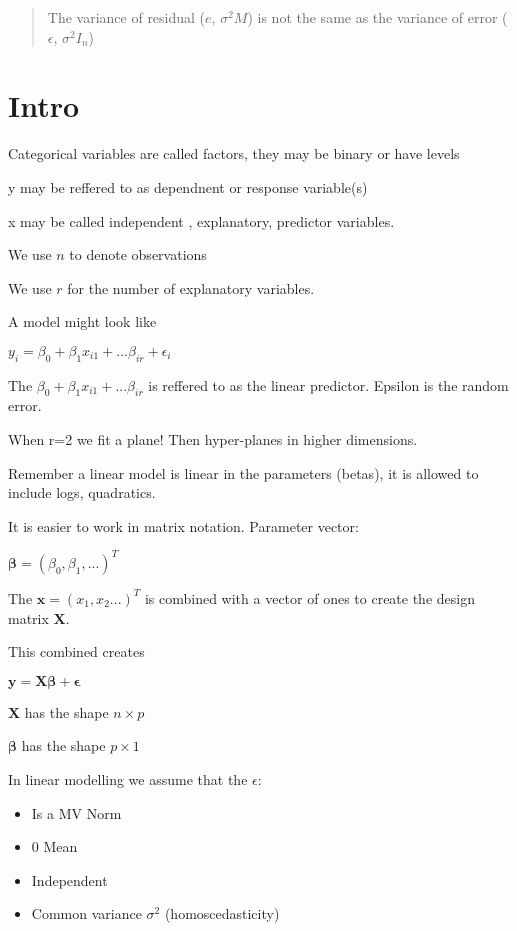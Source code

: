 \documentclass[
  letterpaper,
  DIV=11,
  numbers=noendperiod]{scrreprt}
\providecommand{\tightlist}{%
  \setlength{\itemsep}{0pt}\setlength{\parskip}{0pt}}\usepackage{longtable,booktabs,array}
\begin{document}
\begin{quote}
The variance of residual (\(e\), \(\sigma^2M\)) is not the same as the
variance of error (\(\epsilon\), \(\sigma^2I_n\))
\end{quote}

\hypertarget{intro}{%
\section{Intro}\label{intro}}

Categorical variables are called factors, they may be binary or have
levels

y may be reffered to as dependnent or response variable(s)

x may be called independent , explanatory, predictor variables.

We use \(n\) to denote observations

We use \(r\) for the number of explanatory variables.

A model might look like

\(y_i = \beta_0 + \beta_1x_{i1} + ... \beta_{ir} + \epsilon_i\)

The \(\beta_0 + \beta_1x_{i1} + ... \beta_{ir}\) is reffered to as the
linear predictor. Epsilon is the random error.

When r=2 we fit a plane! Then hyper-planes in higher dimensions.

Remember a linear model is linear in the parameters (betas), it is
allowed to include logs, quadratics.

It is easier to work in matrix notation. Parameter vector:

\(\boldsymbol{\beta} = (\beta_0, \beta_1, ...)^T\)

The \(\boldsymbol{x} = (x_1, x_2...)^T\) is combined with a vector of
ones to create the design matrix \(\boldsymbol{X}\).

This combined creates

\(\boldsymbol{y} = \boldsymbol{X} \boldsymbol{\beta}+ \boldsymbol{\epsilon}\)

\(\boldsymbol{X}\) has the shape \(n \times p\)

\(\boldsymbol{\beta}\) has the shape \(p \times 1\)

In linear modelling we assume that the \(\epsilon\):

\begin{itemize}
\tightlist
\item
  Is a MV Norm
\item
  0 Mean
\item
  Independent
\item
  Common variance \(\sigma^2\) (homoscedasticity)
\end{itemize}
\end{document}
